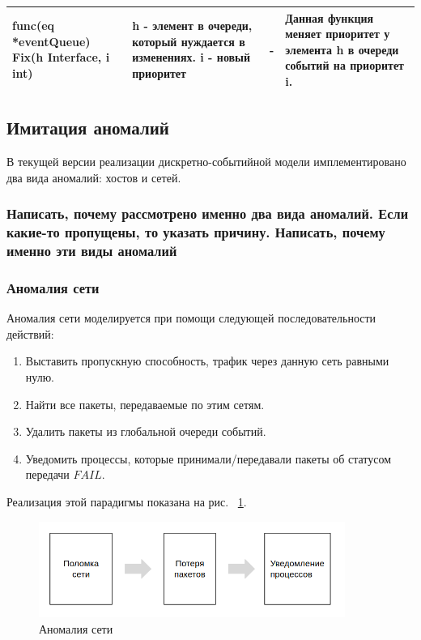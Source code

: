 \begin{table}[]
\begin{tabularx}{\textwidth}{|X|X|X|X|}
func(eq *eventQueue) Fix(h Interface, i int) & h - элемент в очереди, который нуждается в изменениях. i - новый приоритет & -                                               & Данная функция меняет приоритет у элемента h в очереди событий на приоритет i.                                                                                                                                           \\ \hline
\end{tabularx}
\end{table}

\subsection{Имитация аномалий}

В текущей версии реализации дискретно-событийной модели имплементировано два вида аномалий: хостов и сетей.

\subsubsection{Написать, почему рассмотрено именно два вида аномалий. Если какие-то пропущены, то указать причину. Написать, почему именно эти виды аномалий}

\subsubsection{Аномалия сети}

Аномалия сети моделируется при помощи следующей последовательности действий:

\begin{enumerate}
\item Выставить пропускную способность, трафик через данную сеть равными нулю.
\item Найти все пакеты, передаваемые по этим сетям. 
\item Удалить пакеты из глобальной очереди событий. 
\item Уведомить процессы, которые принимали/передавали пакеты об статусом передачи $FAIL$.
\end{enumerate}

Реализация этой парадигмы показана на рис. ~\ref{fig:anom-link}.

\begin{figure}[!ht]
\centering
\includegraphics[width=10cm]{Kenenbek/images/anom-scheme-link.png}
\caption{Аномалия сети}
\label{fig:anom-link}
\end{figure}

